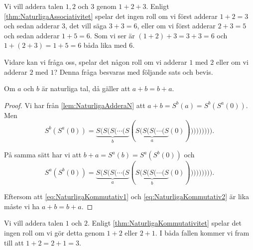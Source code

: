 \begin{example}
  Vi vill addera talen \(1,2\) och \(3\) genom \(1+2+3\).
  Enligt \cref{thm:NaturligaAssociativitet} spelar det ingen roll om vi
  först adderar \(1+2=3\) och sedan adderar \(3\), det vill säga \(3+3=6\),
  eller om vi först adderar \(2+3=5\) och sedan adderar \(1+5=6\).
  Som vi ser är \((1+2)+3=3+3=6\) och \(1+(2+3)=1+5=6\) båda lika med \(6\).
\end{example}

Vidare kan vi fråga oss, spelar det någon roll om vi adderar \(1\) med \(2\)
eller om vi adderar \(2\) med \(1\)?
Denna fråga besvaras med följande sats och bevis.
\begin{theorem}[Kommutativitet]\label{thm:NaturligaKommutativitet}
  Om \(a\) och \(b\) är naturliga tal, då gäller att \(a+b=b+a\).
\end{theorem}
\begin{proof}
  Vi har från \cref{lem:NaturligaAdderaN} att \(a+b=S^b(a)=S^b(S^a(0))\).
  Men
  \begin{equation}
    \label{eq:NaturligaKommutativ1}
    S^b(S^a(0)) =
    \underbrace{S(S(S(\cdots(S}_b(\underbrace{S(S(S(\cdots(S}_a(0)))))))))).
  \end{equation}

  På samma sätt har vi att \(b+a=S^a(b)=S^a(S^b(0))\) och
  \begin{equation}
    \label{eq:NaturligaKommutativ2}
    S^a(S^b(0)) =
    \underbrace{S(S(S(\cdots(S}_a(\underbrace{S(S(S(\cdots(S}_b(0)))))))))).
  \end{equation}

  Eftersom att \cref{eq:NaturligaKommutativ1} och
  \cref{eq:NaturligaKommutativ2} är lika måste vi ha \(a+b=b+a\).
\end{proof}

\begin{example}
  Vi vill addera talen \(1\) och \(2\).
  Enligt \cref{thm:NaturligaKommutativitet} spelar det ingen roll om vi 
  gör detta genom \(1+2\) eller \(2+1\).
  I båda fallen kommer vi fram till att \(1+2=2+1=3\).
\end{example}



